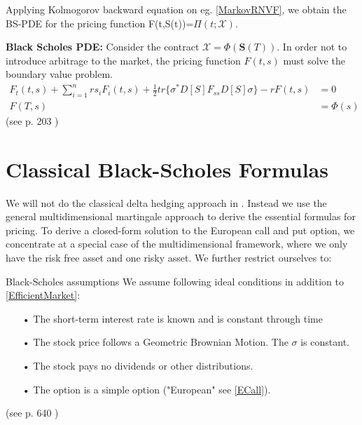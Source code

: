 Applying Kolmogorov backward equation on eg. \ref{MarkovRNVF}, we obtain the BS-PDE for the pricing function F(t,S(t))=$\Pi(t; \mathcal{X})$.

\begin{theorem}\label{BSPDEMultiDim}
\textbf{Black Scholes PDE: } Consider the contract $\mathcal{X}=\Phi(\bm{S}(T))$. In order not to introduce arbitrage to the market, the pricing function $F(t,s)$ must solve the boundary value problem.
\begin{equation}
\begin{split}
F_t(t,s)+\sum_{i=1}^{n} rs_iF_i(t,s)+\frac{1}{2} tr\{\sigma^* D[S] F_{ss} D[S] \sigma\} -rF(t,s)&=0\\
F(T,s)&=\Phi(s)
\end{split}
\end{equation}
(see p. 203 \parencite{finKont})
\end{theorem}


\section{Classical Black-Scholes Formulas}\label{classicBS}
We will not do the classical delta hedging approach in \parencite{B-S-Paper}. Instead we use the general multidimensional martingale approach to derive the essential formulas for pricing. 
To derive a closed-form solution to the European call and put option, we concentrate at a special case of the multidimensional framework, where we only have the risk free asset and one risky asset. 
We further restrict ourselves to:\\
\theoremstyle{assumption}
\begin{assumption}{Black-Scholes assumptions}\label{BS-Assumption}
We assume following ideal conditions in addition to \eqref{EfficientMarket}:
\begin{enumerate}
\item[•] The short-term interest rate is known and is constant through time 
\item[•] The stock price follows a Geometric Brownian Motion. The $\sigma$ is constant.\item[•] The stock pays no dividends or other distributions.
\item[•] The option is a simple option ("European" see \eqref{ECall}).
\end{enumerate}
(see p. 640 \parencite{B-S-Paper})
\end{assumption}

